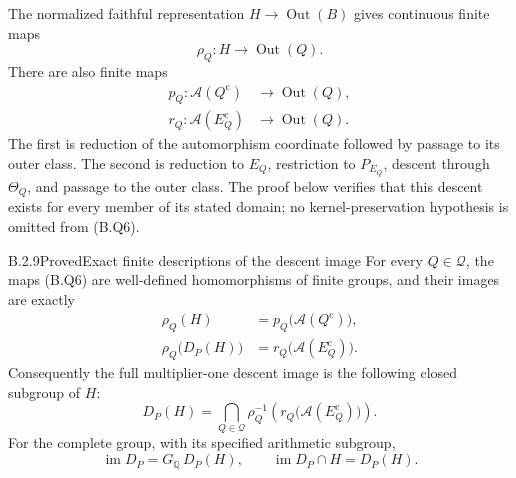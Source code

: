 The normalized faithful representation
$H\to\operatorname{Out}(B)$ gives continuous finite maps
\[
 \rho_Q:H\longrightarrow\operatorname{Out}(Q).
\]
There are also finite maps
\[
\begin{aligned}
 p_Q:\mathcal A(Q^{\mathrm c})&\longrightarrow
                         \operatorname{Out}(Q),\\
 r_Q:\mathcal A(E_Q^{\mathrm c})&\longrightarrow
                         \operatorname{Out}(Q).
\end{aligned}                                                   \tag{B.Q6}
\]
The first is reduction of the automorphism coordinate followed
by passage to its outer class.  The second is reduction to
$E_Q$, restriction to $P_{E_Q}$, descent through $\Theta_Q$,
and passage to the outer class.  The proof below verifies that
this descent exists for every member of its stated domain;
no kernel-preservation hypothesis is omitted from (B.Q6).

\begin{result}{B.2.9}{Proved}{Exact finite descriptions of the descent image}
For every $Q\in\mathcal Q$, the maps (B.Q6) are well-defined
homomorphisms of finite groups, and their images are exactly
\[
\begin{aligned}
 \rho_Q(H)&=p_Q\bigl(\mathcal A(Q^{\mathrm c})\bigr),\\
 \rho_Q\bigl(D_P(H)\bigr)
          &=r_Q\bigl(\mathcal A(E_Q^{\mathrm c})\bigr).
\end{aligned}                                                   \tag{B.Q7}
\]
Consequently the full multiplier-one descent image is the
following closed subgroup of $H$:
\[
 D_P(H)=\bigcap_{Q\in\mathcal Q}
       \rho_Q^{-1}\!\left(
             r_Q\bigl(\mathcal A(E_Q^{\mathrm c})\bigr)\right).
                                                                  \tag{B.Q8}
\]
For the complete group, with its specified arithmetic subgroup,
\[
 \operatorname{im}D_P=G_{\mathbb Q}\,D_P(H),\qquad
 \operatorname{im}D_P\cap H=D_P(H).                              \tag{B.Q9}
\]
\end{result}

